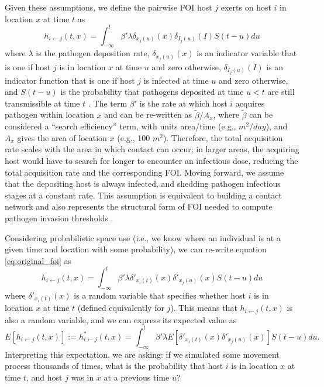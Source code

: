 ﻿\documentclass[11pt]{article}
\begin{document}
Given these assumptions, we define the pairwise FOI host $j$ exerts on host $i$ in location $x$ at time $t$ as \citep{Wilber2022}
\begin{equation}
    h_{i \leftarrow j}(t, x) = \int_{-\infty}^{t} \beta' \lambda \delta_{x_j(u)}(x) \delta_{I_j(u)}(I) S(t - u) du
    \label{eq:original_foi}
\end{equation}
where $\lambda$ is the pathogen deposition rate, $\delta_{x_j(u)}(x)$ is an indicator variable that is one if host $j$ is in location $x$ at time $u$ and zero otherwise, $\delta_{I_j(u)}(I)$ is an indicator function that is one if host $j$ is infected at time $u$ and zero otherwise, and $S(t-u)$ is the probability that  pathogens deposited at time $u < t$ are still transmissible at time $t$ \citep[see][for a full derivation]{Wilber2022}. 
The term $\beta'$ is the rate at which host $i$ acquires pathogen within location $x$ and can be re-written as $\tilde{\beta} / A_x$, where $\tilde{\beta}$ can be considered a ``search efficiency'' term, with units area/time (e.g., $m^2 / day$), and $A_x$ gives the area of location $x$ (e.g., 100 $m^2$). 
Therefore, the total acquisition rate scales with the area in which contact can occur; in larger areas, the acquiring host would have to search for longer to encounter an infectious dose, reducing the total acquisition rate and the corresponding FOI. Moving forward, we assume that the depositing host is always infected, and shedding pathogen infectious stages at a constant rate. This assumption is equivalent to building a contact network and also represents the structural form of FOI needed to compute pathogen invasion thresholds \citep{Wilber2022}.

Considering probabilistic space use (i.e., we know where an individual is at a given time and location with some probability), we can re-write equation \ref{eq:original_foi} as
\begin{equation}
    h_{i \leftarrow j}(t, x) = \int_{-\infty}^{t} \beta' \lambda \delta'_{x_i(t)}(x) \delta'_{x_j(u)}(x) S(t - u) du
    \label{eq:prob_foi}
\end{equation}
where $\delta'_{x_i(t)}(x)$ is a random variable that specifies whether host $i$ is in location $x$ at time $t$ (defined equivalently for $j$).  This means that $h_{i \leftarrow j}(t, x)$ is also a random variable, and we can express its expected value as 
\begin{equation}
    E[h_{i \leftarrow j}(t, x)] := h^*_{i \leftarrow j}(t, x) = \int_{-\infty}^{t} \beta' \lambda E[\delta'_{x_i(t)}(x) \delta'_{x_j(u)}(x)] S(t - u) du.
    \label{eq:expected_foi}
\end{equation}
Interpreting this expectation, we are asking: if we simulated some movement process thousands of times, what is the probability that host $i$ is in location $x$ at time $t$, and host $j$ was in $x$ at a previous time $u$? 
\end{document}
